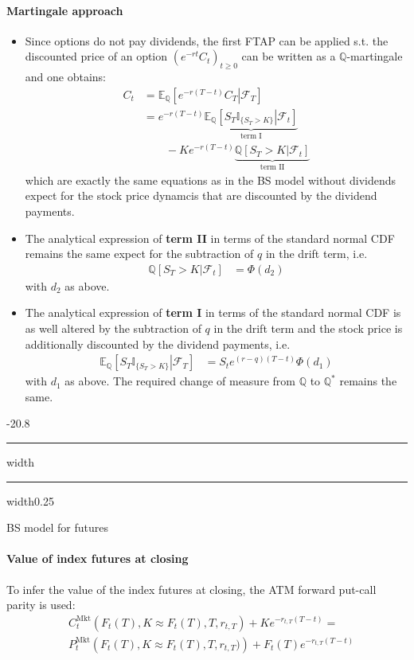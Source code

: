 \documentclass[a4paper,landscape,7pt,fleqn]{scrartcl}
\makeatletter
\renewcommand{\emph}[1]{\textbf{#1}}
\renewcommand{\subsection}{\@startsection{subsection}{1}{0mm}%
{-2\baselineskip}{0.8\baselineskip}%
{\hrule depth 0.2pt width\columnwidth\hrule depth0.75pt
width0.25\columnwidth\vspace*{1.2em}\large\bfseries}}
\makeatother
\begin{document}
\begin{multicols*}{3}
\paragraph{Martingale approach}
\begin{itemize}
\item Since options do not pay dividends, the first FTAP can be applied s.t. the discounted price of an option $\left( e^{-rt} C_t \right)_{t \geq 0}$ can be written as a $\mathbb{Q}$-martingale and one obtains:
\begin{align*}
C_t &= \mathbb{E}_\mathbb{Q} \left[ \left. e^{-r (T-t)} C_T \right| \mathcal{F}_T \right] \\
&= e^{-r(T-t)} \underbrace{\mathbb{E}_\mathbb{Q}\left[ \left. S_T \mathbb{I}_{\{ S_T > K \}} \right| \mathcal{F}_t \right]}\limits_\text{term I} \\
& \qquad - K e^{-r(T-t)} \underbrace{\mathbb{Q} \left[ \left. S_T > K \right| \mathcal{F}_t \right]}\limits_\text{term II}
\end{align*}
which are exactly the same equations as in the BS model without dividends expect for the stock price dynamcis that are discounted by the dividend payments.
\item The analytical expression of \emph{term II} in terms of the standard normal CDF remains the same expect for the subtraction of $q$ in the drift term, i.e.
\begin{align*}
\mathbb{Q} \left[ \left. S_T > K \right| \mathcal{F}_t \right] &= \Phi \left( d_2 \right)
\end{align*}
with $d_2$ as above.
\item The analytical expression of \emph{term I} in terms of the standard normal CDF is as well altered by the subtraction of $q$ in the drift term and the stock price is additionally discounted by the dividend payments, i.e.
\begin{align*}
\mathbb{E}_\mathbb{Q}\left[ \left. S_T \mathbb{I}_{\{ S_T > K \}} \right| \mathcal{F}_T \right] &= S_t e^{(r-q)(T-t)} \Phi \left( d_1 \right)
\end{align*}
with $d_1$ as above. The required change of measure from $\mathbb{Q}$ to $\mathbb{Q}^\ast$ remains the same.
\end{itemize}

\subsection{BS model for futures}

\paragraph{Value of index futures at closing}
To infer the value of the index futures at closing, the ATM forward put-call parity is used:
\begin{align*}
& C_t^\text{Mkt} \left( F_t(T), K \approx F_t(T), T, r_{t,T} \right) + K e^{-r_{t,T} (T-t)} = \\
& P_t^\text{Mkt} \left( F_t(T), K \approx F_t(T), T, r_{t,T}) \right) + F_t(T) e^{-r_{t,T} (T-t)}
\end{align*}


\end{multicols*}
\end{document}
